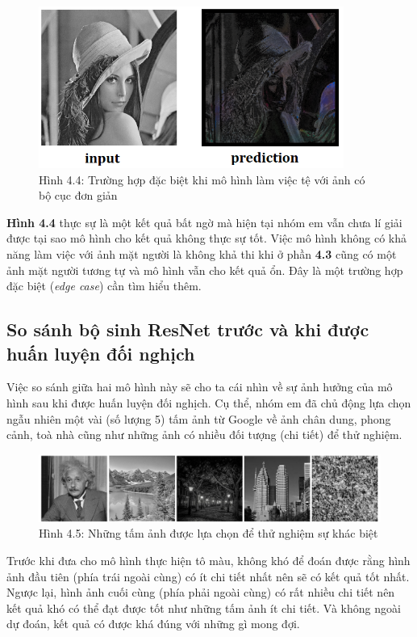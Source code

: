 \documentclass[a4paper]{article}
\begin{document}
\begin{figure}[h!]
\centering
\includegraphics[width=10cm]{images/4_13.png}
\caption{Hình 4.4: Trường hợp đặc biệt khi mô hình làm việc tệ với ảnh có bộ cục đơn giản}
\end{figure}

\noindent
\textbf{Hình 4.4} thực sự là một kết quả bất ngờ mà hiện tại nhóm em vẫn chưa lí giải được tại sao mô hình cho kết quả không thực sự tốt. Việc mô hình không có khả năng làm việc với ảnh mặt người là không khả thi khi ở phần \textbf{4.3 } cũng có một ảnh mặt người tương tự và mô hình vẫn cho kết quả ổn. Đây là một trường hợp đặc biệt (\textit{edge case}) cần tìm hiểu thêm.

\subsection{So sánh bộ sinh ResNet trước và khi được huấn luyện đối nghịch}\label{compare}
Việc so sánh giữa hai mô hình này sẽ cho ta cái nhìn về sự ảnh hưởng của mô hình sau khi được huấn luyện đối nghịch. Cụ thể, nhóm em đã chủ động lựa chọn ngẫu nhiên một vài (số lượng 5) tấm ảnh từ Google về ảnh chân dung, phong cảnh, toà nhà cũng như những ảnh có nhiều đối tượng (chi tiết) để thử nghiệm.

\begin{figure}[h!]
\centering
\includegraphics[width=15cm]{images/4_2.PNG}
\caption{Hình 4.5: Những tấm ảnh được lựa chọn để thử nghiệm sự khác biệt}
\end{figure}

\noindent
Trước khi đưa cho mô hình thực hiện tô màu, không khó để đoán được rằng hình ảnh đầu tiên (phía trái ngoài cùng) có ít chi tiết nhất nên sẽ có kết quả tốt nhất. Ngược lại, hình ảnh cuối cùng (phía phải ngoài cùng) có rất nhiều chi tiết nên kết quả khó có thể đạt được tốt như những tấm ảnh ít chi tiết. Và không ngoài dự đoán, kết quả có được khá đúng với những gì mong đợi.
\end{document}
